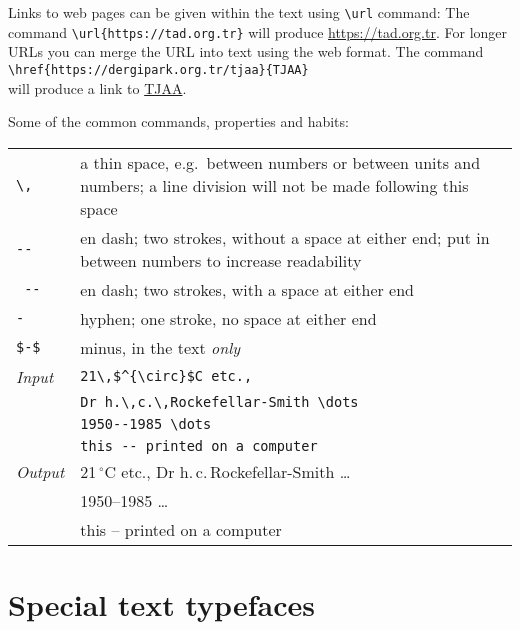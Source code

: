 \documentclass[usenatbib]{tjaa}
\begin{document}
Links to web pages can be given within the text using \verb|\url| command:
The command \verb|\url{https://tad.org.tr}| will produce
\url{https://tad.org.tr}.
For longer URLs you can merge the URL into text using the web format.
The command
\verb|\href{https://dergipark.org.tr/tjaa}{TJAA}|\\
will produce a link to \href{https://dergipark.org.tr/tjaa}{TJAA}.

Some of the common commands, properties and habits:
\begin{flushleft}
\begin{tabular}{@{}p{}p{}}
\verb|\,|   & a thin space, e.g.\ between numbers or between units
              and numbers; a line division will not be made
              following this space\\
\verb|--|   & en dash; two strokes, without a space at either end;
	      put in between numbers to increase readability\\
\verb*| -- |& en dash; two strokes, with  a space at either end\\
\verb|-|    & hyphen; one stroke, no space at either end\\
\verb|$-$|  & minus, in the text {\em only} \\
{\em Input} & \verb|21\,$^{\circ}$C etc.,|\\
            & \verb|Dr h.\,c.\,Rockefellar-Smith \dots|\\
            & \verb|1950--1985 \dots|\\
            & \verb|this -- printed on a computer|\\
{\em Output}& 21\,$^{\circ}$C etc., Dr h.\,c.\,Rockefellar-Smith \dots\\
            & 1950--1985 \dots\\
            & this -- printed on a computer
\end{tabular}
\end{flushleft}

\section{Special text typefaces}
\end{document}
